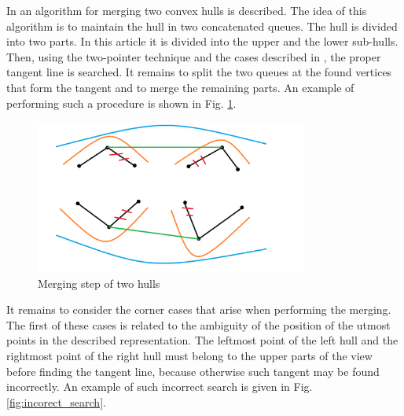 \documentclass[a4paper,UKenglish,cleveref, autoref]{socg-lipics-v2019}
\begin{document}

	
	In \cite{overmars} an algorithm for merging two convex hulls is described. The idea of this algorithm is to maintain the hull in two concatenated queues. The hull is divided into two parts. In this article it is divided into the upper and the lower sub-hulls. Then, using the two-pointer technique and the cases described in \cite{overmars}, the proper tangent line is searched. It remains to split the two queues at the found vertices that form the tangent and to merge the remaining parts. An example of performing such a procedure is shown in Fig. \ref{fig:ch_union}.
	
	\begin{figure}[t]
		\centering
		\includegraphics[width=0.8\textwidth, height=0.3\textheight]{ch_union}
		\caption{Merging step of two hulls}
		\label{fig:ch_union}
	\end{figure}
	
	It remains to consider the corner cases that arise when performing the merging. The first of these cases is related to the ambiguity of the position of the utmost points in the described representation. The leftmost point of the left hull and the rightmost point of the right hull must belong to the upper parts of the view before finding the tangent line, because otherwise such tangent may be found incorrectly. An example of such incorrect search is given in Fig. \ref{fig:incorect_search}.
	
\end{document}
